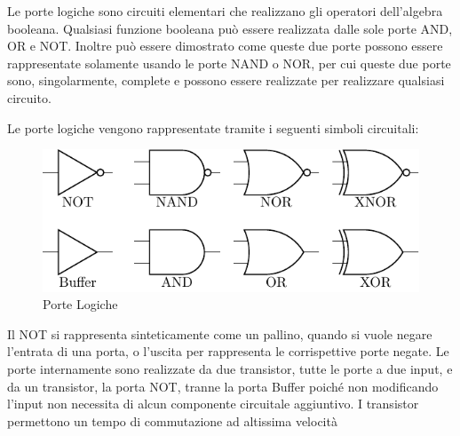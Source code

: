\documentclass{article}
\numberwithin{equation}{subsection}
\begin{document}
Le porte logiche sono circuiti elementari che realizzano gli operatori dell'algebra booleana. Qualsiasi funzione booleana può essere realizzata dalle sole porte AND, OR e NOT. Inoltre può essere dimostrato come queste 
due porte possono essere rappresentate solamente usando le porte NAND o NOR, per cui queste due porte sono, singolarmente, complete e possono essere realizzate per realizzare qualsiasi circuito. 

Le porte logiche vengono rappresentate tramite i seguenti simboli circuitali:
\begin{figure}[H]%
    \centering
    \includegraphics{porte-logiche.pdf}%
    \caption{Porte Logiche}%
\end{figure}
Il NOT si rappresenta sinteticamente come un pallino, quando si vuole negare l'entrata di una porta, o l'uscita per rappresenta le corrispettive porte negate. 
Le porte internamente sono realizzate da due transistor, tutte le porte a due input, e da un transistor, la porta NOT, tranne la porta Buffer poiché non modificando l'input non necessita di alcun componente circuitale 
aggiuntivo. I transistor permettono un tempo di commutazione ad altissima velocità
\end{document}
